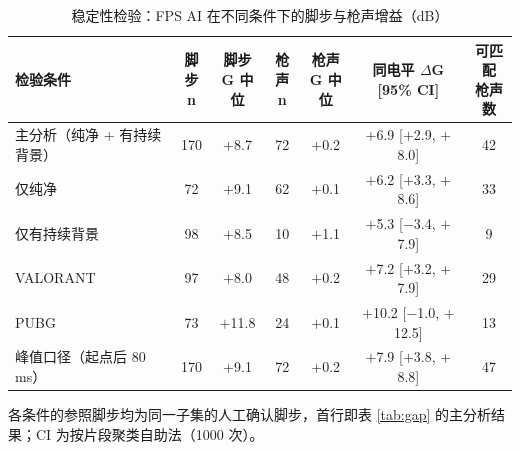 \begin{table}[htbp]\centering
\caption{稳定性检验：FPS AI 在不同条件下的脚步与枪声增益（dB）}\label{tab:robust}
{\small\begin{threeparttable}
\begin{tabular}{lcccccc}\toprule
检验条件 & \makecell{脚步\\n} & \makecell{脚步\\G 中位} & \makecell{枪声\\n} & \makecell{枪声\\G 中位} & \makecell{同电平 $\Delta$G\\{[}95\% CI{]}} & \makecell{可匹配\\枪声数} \\
\midrule
主分析（纯净 + 有持续背景） & 170 & $+$8.7 & 72 & $+$0.2 & $+$6.9 [$+$2.9, $+$8.0] & 42 \\
仅纯净 & 72 & $+$9.1 & 62 & $+$0.1 & $+$6.2 [$+$3.3, $+$8.6] & 33 \\
仅有持续背景 & 98 & $+$8.5 & 10 & $+$1.1 & $+$5.3 [$-$3.4, $+$7.9] & 9 \\
VALORANT & 97 & $+$8.0 & 48 & $+$0.2 & $+$7.2 [$+$3.2, $+$7.9] & 29 \\
PUBG & 73 & $+$11.8 & 24 & $+$0.1 & $+$10.2 [$-$1.0, $+$12.5] & 13 \\
峰值口径（起点后 80 ms） & 170 & $+$9.1 & 72 & $+$0.2 & $+$7.9 [$+$3.8, $+$8.8] & 47 \\
\bottomrule\end{tabular}
\begin{tablenotes}\footnotesize\item 各条件的参照脚步均为同一子集的人工确认脚步，首行即表 \ref{tab:gap} 的主分析结果；CI 为按片段聚类自助法（1000 次）。\end{tablenotes}\end{threeparttable}}
\end{table}
